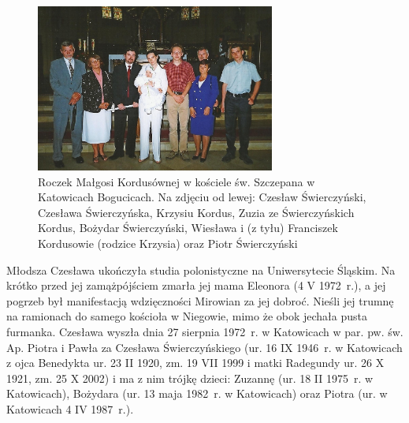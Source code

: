 \begin{figure}
\begin{center}
\includegraphics[width=0.7\textwidth]{zdjecia/roczek_malgorzaty_kordus.jpg}
\caption[Roczek Małgorzaty Kordus]{Roczek Małgosi Kordusównej w kościele św. Szczepana w Katowicach Bogucicach. Na zdjęciu od lewej: Czesław Świerczyński, Czesława Świerczyńska, Krzysiu Kordus, Zuzia ze Świerczyńskich Kordus, Bożydar Świerczyński, Wiesława i (z tyłu) Franciszek Kordusowie (rodzice Krzysia) oraz Piotr Świerczyński}
\label{rys:roczek_malgorzaty_kordus}
\end{center}
\end{figure}

Młodsza Czesława ukończyła studia polonistyczne na Uniwersytecie Śląskim. Na krótko przed jej zamążpójściem zmarła jej mama Eleonora (4 V 1972~r.), a jej pogrzeb był manifestacją wdzięczności Mirowian za jej dobroć. Nieśli jej trumnę na ramionach do samego kościoła w Niegowie, mimo że obok jechała pusta furmanka. Czesława wyszła dnia 27 sierpnia 1972~r.  w Katowicach w par. pw. św. Ap. Piotra i Pawła za Czesława Świerczyńskiego (ur. 16 IX 1946~r. w Katowicach z ojca Benedykta ur. 23 II 1920, zm. 19 VII 1999 i matki Radegundy ur. 26 X 1921, zm. 25 X 2002) i ma z nim trójkę dzieci: Zuzannę (ur. 18 II 1975~r. w Katowicach), Bożydara (ur. 13 maja 1982~r. w Katowicach) oraz Piotra (ur. w Katowicach 4 IV 1987~r.).

